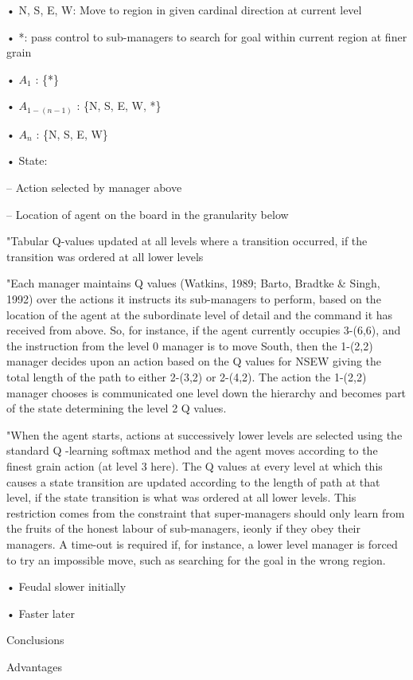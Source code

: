 \documentclass[english]{article}
\begin{document}
• N, S, E, W: Move to region in given
cardinal direction at current level

• *: pass control to sub-managers to
search for goal within current region
at finer grain

• $A_1$ : \{*\}

• $A_{1-(n-1)}$ : \{N, S, E, W, *\}

• $A_n$ : \{N, S, E, W\}

• State:

– Action selected by manager above

– Location of agent on the board in the
granularity below

"Tabular Q-values updated at
all levels where a transition
occurred, if the transition
was ordered at all lower
levels

"Each manager maintains Q values (Watkins, 1989; Barto, Bradtke \& Singh, 1992)
over the actions it instructs its sub-managers to perform, based on the location of
the agent at the subordinate level of detail and the command it has received from
above. So, for instance, if the agent currently occupies 3-(6,6), and the instruction
from the level 0 manager is to move South, then the 1-(2,2) manager decides upon
an action based on the Q values for NSEW giving the total length of the path to
either 2-(3,2) or 2-(4,2). The action the 1-(2,2) manager chooses is communicated
one level down the hierarchy and becomes part of the state determining the level 2
Q values.

"When the agent starts, actions at successively lower levels are selected using the
standard Q -learning softmax method and the agent moves according to the finest
grain action (at level 3 here). The Q values at every level at which this causes
a state transition are updated according to the length of path at that level, if the
state transition is what was ordered at all lower levels. This restriction comes from
the constraint that super-managers should only learn from the fruits of the honest
labour of sub-managers, ieonly if they obey their managers. A time-out is required
if, for instance, a lower level manager is forced to try an impossible move, such as
searching for the goal in the wrong region.

•  Feudal slower initially

• Faster later

\item  
Conclusions

Advantages

\benum
\end{document}
